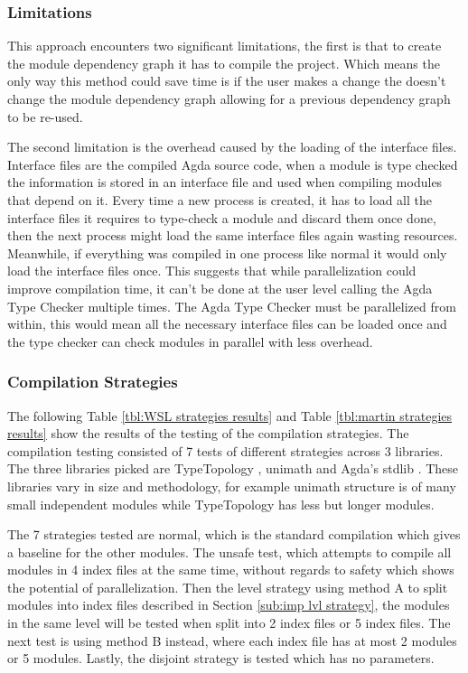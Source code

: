 \subsubsection{Limitations} \label{ssub:eval comp limitations}

This approach encounters two significant limitations, the first is that to
create the module dependency graph it has to compile the project. Which means
the only way this method could save time is if the user makes a change the
doesn't change the module dependency graph allowing for a previous dependency
graph to be re-used.

The second limitation is the overhead caused by the loading of the interface
files. Interface files are the compiled Agda source code, when a module is type
checked the information is stored in an interface file and used when compiling
modules that depend on it. Every time a new process is created, it has to load
all the interface files it requires to type-check a module and discard them
once done, then the next process might load the same interface files again
wasting resources. Meanwhile, if everything was compiled in one process like
normal it would only load the interface files once. This suggests that while
parallelization could improve compilation time, it can't be done at the user
level calling the Agda Type Checker multiple times. The Agda Type Checker must
be parallelized from within, this would mean all the necessary interface files
can be loaded once and the type checker can check modules in parallel with less
overhead.

\subsubsection{Compilation Strategies} \label{ssub:eval comp strat}

The following Table \ref{tbl:WSL strategies results} and Table \ref{tbl:martin
strategies results} show the results of the testing of the compilation
strategies. The compilation testing consisted of 7 tests of different
strategies across 3 libraries. The three libraries picked are TypeTopology
\cite{type-topology}, unimath \cite{agda-unimath} and Agda's stdlib
\cite{stdlib}. These libraries vary in size and methodology, for example
unimath structure is of many small independent modules while TypeTopology has
less but longer modules.

The 7 strategies tested are normal, which is the standard compilation which
gives a baseline for the other modules. The unsafe test, which attempts to
compile all modules in 4 index files at the same time, without regards to
safety which shows the potential of parallelization. Then the level strategy
using method A to split modules into index files described in Section
\ref{sub:imp lvl strategy}, the modules in the same level will be tested when
split into 2 index files or 5 index files. The next test is using method B
instead, where each index file has at most 2 modules or 5 modules. Lastly, the
disjoint strategy is tested which has no parameters.

